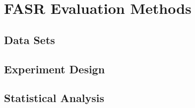 \chapter{FASR Evaluation Methods}
\section{Data Sets}

\section{Experiment Design}

\section{Statistical Analysis}
